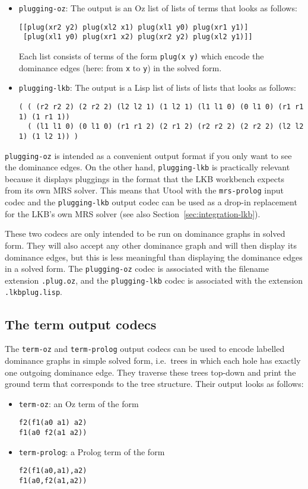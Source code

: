\begin{itemize}
\item \verb?plugging-oz?: The output is an Oz list of lists of terms
  that looks as follows:
\begin{verbatim}
[[plug(xr2 y2) plug(xl2 x1) plug(xl1 y0) plug(xr1 y1)]
 [plug(xl1 y0) plug(xr1 x2) plug(xr2 y2) plug(xl2 y1)]]
\end{verbatim}
Each list consists of terms of the form \verb?plug(x y)? which encode
the dominance edges (here: from \verb?x? to \verb?y?) in the solved
form.
\item \verb?plugging-lkb?: The output is a Lisp list of lists of lists
  that looks as follows:
\begin{verbatim}
( ( (r2 r2 2) (2 r2 2) (l2 l2 1) (1 l2 1) (l1 l1 0) (0 l1 0) (r1 r1 1) (1 r1 1))
  ( (l1 l1 0) (0 l1 0) (r1 r1 2) (2 r1 2) (r2 r2 2) (2 r2 2) (l2 l2 1) (1 l2 1)) )
\end{verbatim}


\end{itemize}

\verb?plugging-oz? is intended as a convenient output format if you
only want to see the dominance edges. On the other hand,
\verb?plugging-lkb? is practically relevant because it displays
pluggings in the format that the LKB workbench expects from its own
MRS solver. This means that Utool with the \verb?mrs-prolog? input
codec and the \verb?plugging-lkb? output codec can be used as a
drop-in replacement for the LKB's own MRS solver (see also
Section~\ref{sec:integration-lkb}).

These two codecs are only intended to be run on dominance graphs in
solved form. They will also accept any other dominance graph and will
then display its dominance edges, but this is less meaningful than
displaying the dominance edges in a solved form. The
\verb?plugging-oz? codec is associated with the filename extension
\verb?.plug.oz?, and the \verb?plugging-lkb? codec is associated with
the extension \verb?.lkbplug.lisp?.



\subsection{The term output codecs}

The \verb?term-oz? and \verb?term-prolog? output codecs can be used to
encode labelled dominance graphs in simple solved form, i.e.\ trees in
which each hole has exactly one outgoing dominance edge. They traverse
these trees top-down and print the ground term that corresponds to the
tree structure. Their output looks as follows:
\begin{itemize}
\item \verb?term-oz?: an Oz term of the form
\begin{verbatim}
f2(f1(a0 a1) a2)
f1(a0 f2(a1 a2))
\end{verbatim}
\item \verb?term-prolog?:  a Prolog term of the form
\begin{verbatim}
f2(f1(a0,a1),a2)
f1(a0,f2(a1,a2))
\end{verbatim}
\end{itemize}

